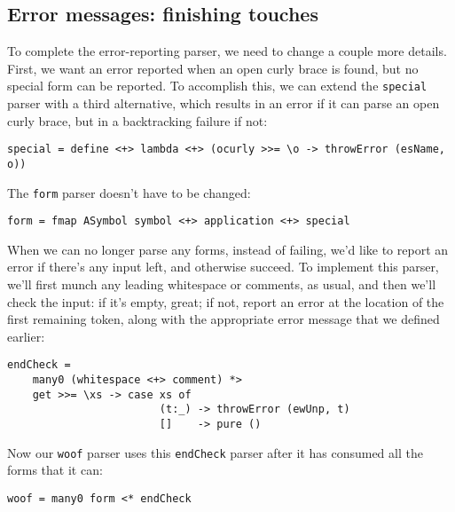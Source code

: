 \documentclass{tmr}
\begin{document}
\subsection{Error messages:  finishing touches}
To complete the error-reporting parser, we need to change a couple more details. 
First, we want an error reported when an open curly brace is found, but no 
special form can be reported.  To accomplish this, we can extend the \verb+special+ 
parser with a third alternative, which results in an error if it can parse
an open curly brace, but in a backtracking failure if not:
\begin{verbatim}
special = define <+> lambda <+> (ocurly >>= \o -> throwError (esName, o))
\end{verbatim}
The \verb+form+ parser doesn't have to be changed:
\begin{verbatim}
form = fmap ASymbol symbol <+> application <+> special
\end{verbatim}
When we can no longer parse any forms, instead of failing, we'd like to report an error if there's any input
left, and otherwise succeed.  To implement this parser, we'll first munch any leading whitespace or comments, 
as usual, and then we'll check the input:  if it's empty, great; if not, report an error at the location of the
first remaining token, along with the appropriate error message that we defined earlier:
\begin{verbatim}
endCheck = 
    many0 (whitespace <+> comment) *>
    get >>= \xs -> case xs of
                        (t:_) -> throwError (ewUnp, t)
                        []    -> pure ()
\end{verbatim}
Now our \verb+woof+ parser uses this \verb+endCheck+ parser after it has consumed all the forms that it can:
\begin{verbatim}
woof = many0 form <* endCheck
\end{verbatim}
\end{document}
